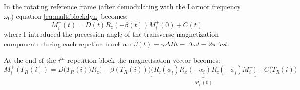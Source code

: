 \hfill

In the rotating reference frame (after demodulating with the Larmor frequency $\omega_0$) equation \ref{eq:multiblockdyn} becomes:
\begin{equation}\label{eq:multiblockdynfinal}
    M^{+}_i (t)  = D(t) R_z(-\beta(t)) M^{+}_i (0) + C(t)
\end{equation}
where I introduced the precession angle of the transverse magnetization components during each repetion block as: $\beta(t) = \gamma \Delta B t = \Delta \omega t = 2\pi \Delta \nu t$. 

\hfill

At the end of the $i^{th}$ repetition block the magnetisation vector becomes:
\begin{equation}
    M^{+}_{i}(T_R(i)) = D\big(T_R(i)\big) R_z\big(-\beta(T_R(i))\big) \underbrace{\big( R_{z}(\phi_i) R_{x}(-\alpha_i) R_{z}(-\phi_i) M^{-}_i \big)}_{M_i^+(0)} + C\big(T_R(i)\big)
\end{equation}




